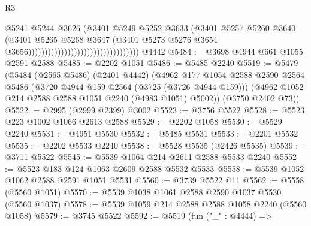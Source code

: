 \begin{lexlean}{R3}
\begin{coremodule}
                                                                @5241
                                                                @5244
                                                                @3626
                                                                (@3401
                                                                  @5249
                                                                  @5252
                                                                  @3633
                                                                  (@3401
                                                                    @5257
                                                                    @5260
                                                                    @3640
                                                                    (@3401
                                                                      @5265
                                                                      @5268
                                                                      @3647
                                                                      (@3401
                                                                        @5273
                                                                        @5276
                                                                        @3654
                                                                        @3656))))))))))))))))))))))))))))))))))
    @4442
@5484 := @3698 @4944 @661 @1055 @2591 @2588
@5485 := @2202 @1051
@5486 := @5485 @2240
@5519 := @5479
    (@5484
      (@2565 @5486)
      (@2401 @4442)
      (@4962
        @177
        @1054
        @2588
        @2590
        @2564
        @5486
        (@3720 @4944 @159 @2564 (@3725 (@3726 @4944 @159)))
        (@4962 @1052 @214 @2588 @2588 @1051 @2240 (@4983 @1051) @5002))
      (@3750 @2402 @73))
@5522 := @2995 (@2999 @2399) @3002
@5523 := @3756 @5522
@5528 := @5523 @223 @1002 @1066 @2613 @2588
@5529 := @2202 @1058
@5530 := @5529 @2240
@5531 := @4951 @5530
@5532 := @5485 @5531
@5533 := @2201 @5532
@5535 := @2202 @5533 @2240
@5538 := @5528 @5535 (@2426 @5535)
@5539 := @3711 @5522
@5545 := @5539 @1064 @214 @2611 @2588 @5533 @2240
@5552 := @5523 @183 @124 @1063 @2609 @2588 @5532 @5533
@5558 := @5539 @1052 @1062 @2588 @2591 @1051 @5531
@5560 := @3739 @5522 @11
@5562 := @5558 (@5560 @1051)
@5570 := @5539 @1038 @1061 @2588 @2590 @1037 @5530 (@5560 @1037)
@5578 := @5539 @1059 @214 @2588 @2588 @1058 @2240 (@5560 @1058)
@5579 := @3745 @5522
@5592 := @5519
    (fun ("_" : @4444) =>

\end{coremodule}
\end{lexlean}
